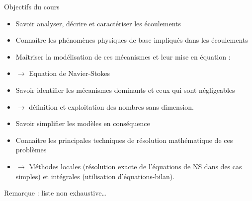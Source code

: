 \begin{frame}{Objectifs du cours}

\small

\begin{itemize}
\item[\checkmark]
	Savoir analyser, décrire et caractériser les écoulements 
\item[\checkmark]
	Connaître les phénomènes physiques de base impliqués dans les écoulements
\item[\checkmark]
	Maîtriser la modélisation de ces mécanismes et leur mise en équation : 
\item[] $\rightarrow$ Equation de Navier-Stokes
\item[\checkmark]
	Savoir identifier les mécanismes dominants et ceux qui sont négligeables
\item[]
	$\rightarrow$ définition et exploitation des nombres sans dimension.
\item[\checkmark]
	Savoir simplifier les modèles en conséquence
\item[\checkmark]
	Connaitre les principales techniques de résolution mathématique de ces problèmes
\item[]
	$\rightarrow$ Méthodes locales (résolution exacte de l'équations de NS dans des cas simples) et intégrales (utilisation d'équations-bilan). 
\end{itemize}

\bigskip

\hfill Remarque : liste non exhaustive\ldots

\vspace{20mm}

\end{frame}




